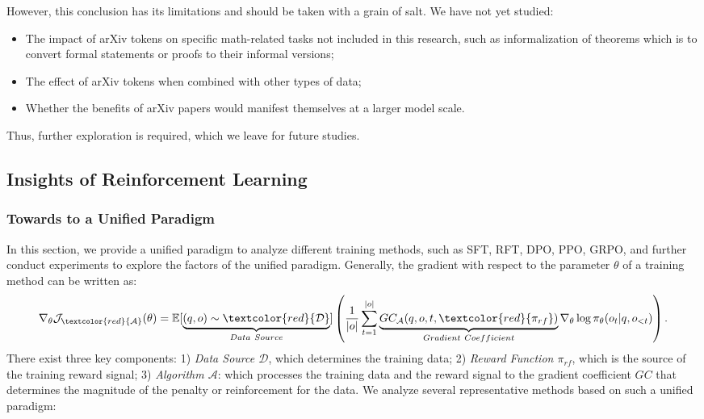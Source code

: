 However, this conclusion has its limitations and should be taken with a grain of salt.
We have not yet studied:
\begin{itemize}[topsep=0pt]
    \item The impact of arXiv tokens on specific math-related tasks not included in this research, such as informalization of theorems which is to convert formal statements or proofs to their informal versions;
    \item The effect of arXiv tokens when combined with other types of data;
    \item Whether the benefits of arXiv papers would manifest themselves at a larger model scale.
\end{itemize}
Thus, further exploration is required, which we leave for future studies.

\subsection{Insights of Reinforcement Learning}
\subsubsection{Towards to a Unified Paradigm}
In this section, we provide a unified paradigm to analyze different training methods, such as SFT, RFT, DPO, PPO, GRPO, and further conduct experiments to explore the factors of the unified paradigm. 
Generally, the gradient with respect to the parameter $\theta$ of a training method can be written as:
\begin{equation}
    \nabla_{\theta}\mathcal{J}_{\textcolor{red}{\mathcal{A}}}(\theta) = \mathbb{E}[\underbrace{(q,o) \sim \textcolor{red}{\mathcal{D}}}_{Data \ Source}]\left( \frac{1}{|o|} \sum_{t=1}^{|o|}  \underbrace{GC_{{\mathcal{A}}}(q, o, t, \textcolor{red}{\pi_{{rf}}})}_{Gradient \ Coefficient}  \nabla_{\theta}\log \pi_{\theta}(o_t | q, o_{<t})\right).
\label{eq:objective}
\end{equation}
There exist three key components: 
1) \textit{Data Source $\mathcal{D}$}, which determines the training data;
2) \textit{Reward Function $\pi_{{rf}}$}, which is the source of the training reward signal;
3) \textit{Algorithm $\mathcal{A}$}: which processes the training data and the reward signal to the gradient coefficient $GC$ that determines the magnitude of the penalty or reinforcement for the data. We analyze several representative methods based on such a unified paradigm:


